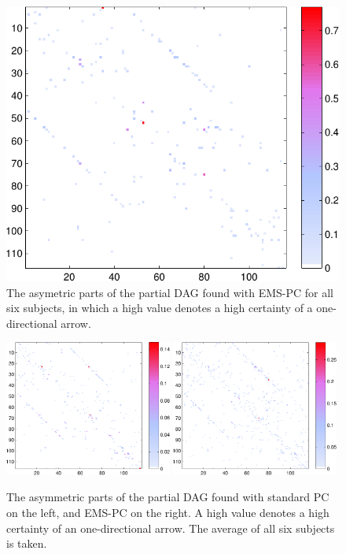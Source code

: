 \documentclass[a4paper, english]{article}
\begin{document}
\begin{figure}[h!]
\begin{minipage}[t]{1.2\textwidth}
  \includegraphics[height=0.26\textheight]{images/new/assym_subj6_expl-crop}
\end{minipage}
  \caption{The asymetric parts of the partial DAG found with EMS-PC for all six subjects, in which a high value denotes a high certainty of a one-directional arrow.}
\label{fig:asym_subjects}
\end{figure}

\begin{figure}[h!]
  \centering
  \includegraphics[width=0.49\textwidth]{images/new/assym_avg_mod-crop}
  \includegraphics[width=0.49\textwidth]{images/new/assym_avg_expl-crop}
  \caption{The asymmetric parts of the partial DAG found with standard PC on the left, and EMS-PC on the right. A high value denotes a high certainty of an one-directional arrow. The average of all six subjects is taken.}
  \label{fig:asym_avg}
\end{figure}
\end{document}
